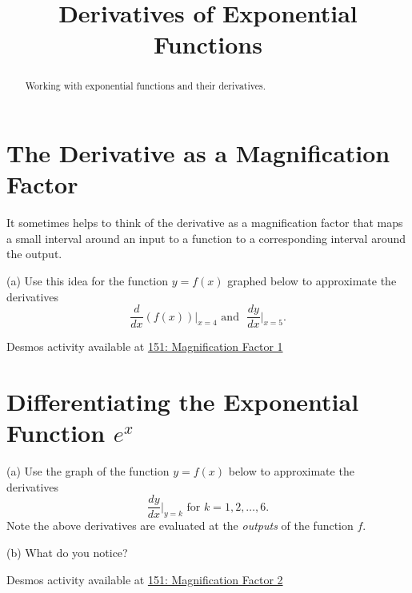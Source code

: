 \documentclass{ximera}
\title{Derivatives of Exponential Functions}
\begin{document}
\begin{abstract}
Working with exponential functions and their derivatives.
\end{abstract}
\maketitle



\section*{The Derivative as a Magnification Factor}
\begin{exploration}   \label{Ex:325gyt}

It sometimes helps to think of the derivative as a magnification factor that maps a small interval around an input to a function to a corresponding interval around the output.

(a) Use this idea for the function $y=f(x)$ graphed below to approximate the derivatives 
\[
    \frac{d}{dx} (f(x))\Big|_{x=4} \text{  and  } \,\, \frac{dy}{dx}\Big|_{x=5} .
\]


\begin{onlineOnly}
    \begin{center}
\end{center}
\end{onlineOnly}


Desmos activity available at \href{https://www.desmos.com/calculator/la4f5ots3r}{151: Magnification Factor 1}

\end{exploration}


\section*{Differentiating the Exponential Function $e^x$}

\begin{exploration}

(a) Use the graph of the function $y=f(x)$ below to approximate the derivatives 
\[
    \frac{dy}{dx}\Big|_{y=k} \text{ for } k=1, 2, \ldots , 6.
\]
Note the above derivatives are evaluated at the \emph{outputs} of the function $f$. 

(b) What do  you notice?

\begin{onlineOnly}
    \begin{center}
\end{center}
\end{onlineOnly}


Desmos activity available at \href{https://www.desmos.com/calculator/k08dphtuca}{151: Magnification Factor 2}


\end{exploration}
\end{document}
